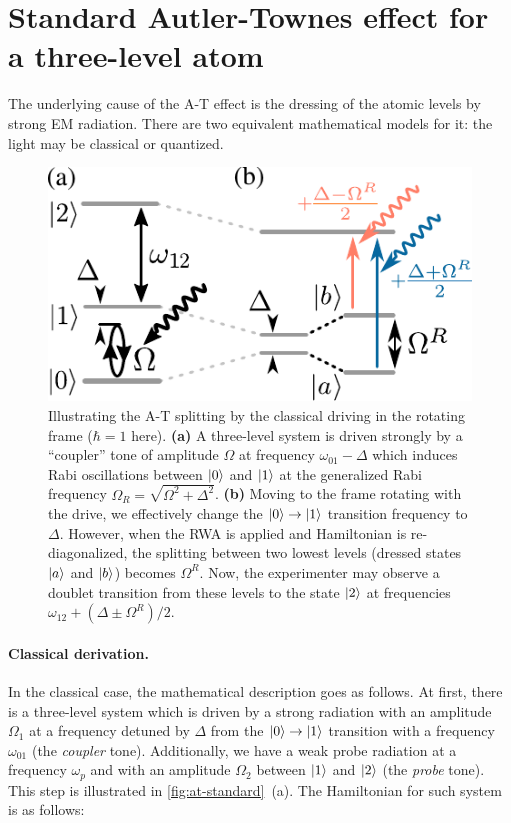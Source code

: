 \documentclass[%
 aip,
 amsmath,amssymb,
 reprint,%
]{revtex4-1}
\begin{document}
\appendix

\section{Standard Autler-Townes effect for a three-level atom} \label{sec:3-level-at}

The underlying cause of the A-T effect is the dressing of the atomic levels by strong EM radiation. There are two equivalent mathematical models for it: the light may be classical or quantized.

\begin{figure}
	\includegraphics[width=\linewidth]{intro_scheme}
	\caption{Illustrating the A-T splitting by  the classical driving in the rotating frame ($\hbar=1$ here). \textbf{(a)} A three-level system is driven strongly by a ``coupler'' tone of amplitude $\Omega$ at frequency $\omega_{01}-\Delta$ which induces Rabi oscillations between $\ket{0}$ and $\ket{1}$ at the generalized Rabi frequency $\Omega_R = \sqrt{\Omega^2 + \Delta^2}$. \textbf{(b)} Moving to the frame rotating with the drive, we effectively change the $\ket{0}\rightarrow \ket{1}$ transition frequency to $\Delta$. However, when the RWA is applied and Hamiltonian is re-diagonalized, the splitting between two lowest levels (dressed states $\ket{a}$ and $\ket{b}$) becomes $\Omega^R$. Now, the experimenter may observe a doublet transition from these levels to the state $\ket{2}$ at frequencies $\omega_{12}+(\Delta \pm \Omega^R)/2$.} 
	\label{fig:at-standard}
\end{figure}

\paragraph{Classical derivation.} In the classical case, the mathematical description goes as follows. At first, there is a three-level system which is driven by a strong radiation with an amplitude $\Omega_1$ at a frequency detuned by $\Delta$ from the $\ket{0}\rightarrow \ket{1}$ transition with a frequency $\omega_{01}$ (the \textit{coupler} tone). Additionally, we have a weak probe radiation at a frequency $\omega_{p}$ and with an amplitude $\Omega_2$ between $\ket{1}$ and $\ket{2}$ (the \textit{probe} tone). This step is illustrated in \autoref{fig:at-standard}~(a). The Hamiltonian for such system is as follows:
\end{document}
